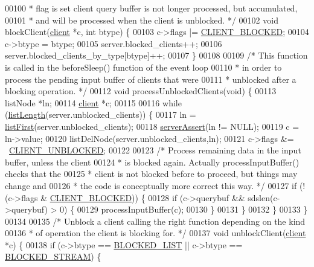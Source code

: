 \begin{DoxyCode}
00100 \textcolor{comment}{ * flag is set client query buffer is not longer processed, but accumulated,}
00101 \textcolor{comment}{ * and will be processed when the client is unblocked. */}
00102 \textcolor{keywordtype}{void} blockClient(\hyperlink{structclient}{client} *c, \textcolor{keywordtype}{int} btype) \{
00103     c->flags |= \hyperlink{server_8h_a503ad979164a52f0f5e2a63e4c7da3a0}{CLIENT\_BLOCKED};
00104     c->btype = btype;
00105     server.blocked\_clients++;
00106     server.blocked\_clients\_by\_type[btype]++;
00107 \}
00108 
00109 \textcolor{comment}{/* This function is called in the beforeSleep() function of the event loop}
00110 \textcolor{comment}{ * in order to process the pending input buffer of clients that were}
00111 \textcolor{comment}{ * unblocked after a blocking operation. */}
00112 \textcolor{keywordtype}{void} processUnblockedClients(\textcolor{keywordtype}{void}) \{
00113     listNode *ln;
00114     \hyperlink{structclient}{client} *c;
00115 
00116     \textcolor{keywordflow}{while} (\hyperlink{adlist_8h_afde0ab079f934670e82119b43120e94b}{listLength}(server.unblocked\_clients)) \{
00117         ln = \hyperlink{adlist_8h_aa8dc514bbe217bb2e87c1c77cfa84690}{listFirst}(server.unblocked\_clients);
00118         \hyperlink{server_8h_a88114b5169b4c382df6b56506285e56a}{serverAssert}(ln != NULL);
00119         c = ln->value;
00120         listDelNode(server.unblocked\_clients,ln);
00121         c->flags &= ~\hyperlink{server_8h_a1252372d6834686c29e958d9d96367a8}{CLIENT\_UNBLOCKED};
00122 
00123         \textcolor{comment}{/* Process remaining data in the input buffer, unless the client}
00124 \textcolor{comment}{         * is blocked again. Actually processInputBuffer() checks that the}
00125 \textcolor{comment}{         * client is not blocked before to proceed, but things may change and}
00126 \textcolor{comment}{         * the code is conceptually more correct this way. */}
00127         \textcolor{keywordflow}{if} (!(c->flags & \hyperlink{server_8h_a503ad979164a52f0f5e2a63e4c7da3a0}{CLIENT\_BLOCKED})) \{
00128             \textcolor{keywordflow}{if} (c->querybuf && sdslen(c->querybuf) > 0) \{
00129                 processInputBuffer(c);
00130             \}
00131         \}
00132     \}
00133 \}
00134 
00135 \textcolor{comment}{/* Unblock a client calling the right function depending on the kind}
00136 \textcolor{comment}{ * of operation the client is blocking for. */}
00137 \textcolor{keywordtype}{void} unblockClient(\hyperlink{structclient}{client} *c) \{
00138     \textcolor{keywordflow}{if} (c->btype == \hyperlink{server_8h_a279f6a31729ba24d6dab0944b82e0b55}{BLOCKED\_LIST} || c->btype == \hyperlink{server_8h_a1f48bb63f9d0c061421044b92b46f679}{BLOCKED\_STREAM}) \{

\end{DoxyCode}
